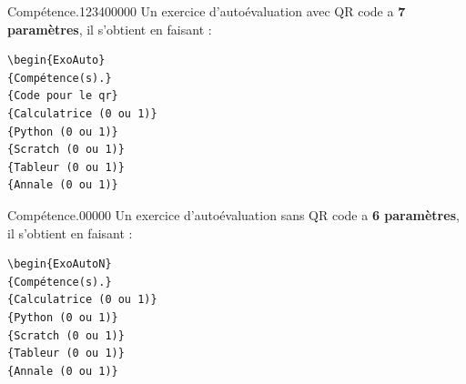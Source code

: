 \begin{pageAD}
\begin{ExoAuto}{Compétence.}{1234}{0}{0}{0}{0}{0}
Un exercice d'autoévaluation avec QR code a \textbf{7 paramètres}, il s'obtient en faisant : 
\begin{verbatim}
\begin{ExoAuto}
{Compétence(s).}
{Code pour le qr}
{Calculatrice (0 ou 1)}
{Python (0 ou 1)}
{Scratch (0 ou 1)}
{Tableur (0 ou 1)}
{Annale (0 ou 1)}
\end{verbatim}
\end{ExoAuto}

\begin{ExoAutoN}{Compétence.}{0}{0}{0}{0}{0}
Un exercice d'autoévaluation sans QR code a \textbf{6 paramètres}, il s'obtient en faisant : 
\begin{verbatim}
\begin{ExoAutoN}
{Compétence(s).}
{Calculatrice (0 ou 1)}
{Python (0 ou 1)}
{Scratch (0 ou 1)}
{Tableur (0 ou 1)}
{Annale (0 ou 1)}
\end{verbatim}
\end{ExoAutoN}

\end{pageAD}

